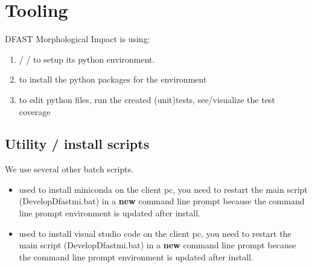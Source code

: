 \section{Tooling}
DFAST Morphological Impact is using:
\begin{enumerate}
\item {} /  / to setup its python environment. 
\item {} to install the python packages for the environment
\item {} to edit python files, run the created (unit)tests, see/visualize the test coverage
\end{enumerate}

\subsection{Utility / install scripts}
We use several other batch scripts.
\begin{itemize}
	\item {} used to install miniconda on the client pc, you need to restart the main script (DevelopDfastmi.bat) in a \textbf{new} command line prompt because the command line prompt environment is
	 updated after install.
	\item {} used to install visual studio code on the client pc, you need to restart the main script (DevelopDfastmi.bat) in a \textbf{new} command line prompt because the command line prompt environment is updated after install.
\end{itemize}

